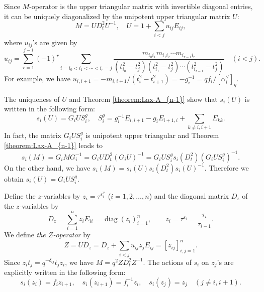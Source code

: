 \documentclass[12pt,twoside]{article}
\newcommand\av{\alpha^\vee}
\newcommand\eps{\varepsilon}
\newcommand\epsv{\eps^\vee}
\newcommand\diag{\mathop{\mathrm{diag}}\nolimits}
\theoremstyle{plain} %
\theoremstyle{definition} %
\theoremstyle{definition} %
\numberwithin{theorem}{section}
\numberwithin{equation}{section}
\numberwithin{figure}{section}
\numberwithin{table}{section}
\newcommand\theoremref[1]{Theorem \ref{#1}}
\begin{document}
Since $M$-operator is the upper triangular matrix with
invertible diagonal entries, 
it can be uniquely diagonalized 
by the unipotent upper triangular matrix $U$:
\begin{equation*}
 M = U D_t^2 U^{-1}, \quad
 U = 1 + \sum_{i<j} u_{ij} E_{ij},
\end{equation*}
where $u_{ij}$'s are given by
\begin{equation*}
 u_{ij} 
 = \sum_{r=1}^{j-i}(-1)^r
   \sum_{i=i_0<i_1<\cdots<i_r=j}
   \frac{m_{i_0i_1}m_{i_1i_2}\cdots m_{i_{r-1}i_r}}
        {(t_{i_0}^2-t_j^2)(t_{i_1}^2-t_j^2)\cdots(t_{i_{r-1}}^2-t_j^2)}
 \quad (i<j).
\end{equation*}
For example, we have 
$u_{i,i+1} = -m_{i,i+1}/(t_i^2-t_{i+1}^2)=-g_i^{-1} = qf_i/[\av_i]_q$. 

The uniqueness of $U$ and \theoremref{theorem:Lax-A_{n-1}} show that
$s_i(U)$ is written in the following form:
\begin{equation}
 s_i(U) = G_i U S_i^g, \quad
 S_i^g = g_i^{-1} E_{i,i+1} - g_i E_{i+1,i} + \sum_{k\ne i,i+1} E_{kk}.
 \label{eq:s_i(U)}
\end{equation}
In fact, the matrix $G_i U S_i^g$ is unipotent upper triangular 
and \theoremref{theorem:Lax-A_{n-1}} leads to
\begin{equation*}
 s_i(M) 
 = G_i M G_i^{-1}
 = G_i U D_t^2 (G_i U)^{-1}
 = G_i U S_i^g s_i(D_t^2) (G_i U S_i^g)^{-1}.
\end{equation*}
On the other hand, we have $s_i(M)=s_i(U)s_i(D_t^2)s_i(U)^{-1}$.
Therefore we obtain $s_i(U)=G_i U S_i^g$.

Define the $z$-variables by $z_i = \tau^{\epsv_i}$ ($i=1,2,\ldots,n$) 
and the diagonal matrix $D_z$ of the $z$-variables by
\begin{equation*}
 D_z = \sum_{i=1}^n z_i E_{ii} = \diag(z_i)_{i=1}^n,
 \qquad z_i = \tau^{\eps_i} = \frac{\tau_i}{\tau_{i-1}}.
\end{equation*}
We define {\em the $Z$-operator} by
\begin{equation*}
 Z = U D_z = D_z + \sum_{i<j} u_{ij}z_j E_{ij} = [z_{ij}]_{i,j=1}^n.
\end{equation*}
Since $z_i t_j = q^{-\delta_{ij}} t_j z_i$, 
we have $M = q^2 Z D_t^2 Z^{-1}$. 
The actions of $s_i$ on $z_j$'s are explicitly written in the following form:
\begin{equation*}
 s_i(z_i)= f_i z_{i+1}, \quad
 s_i(z_{i+1}) = f_i^{-1} z_i, \quad
 s_i(z_j) = z_j \quad (j\ne i,i+1).
\end{equation*}
\end{document}

